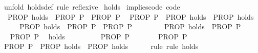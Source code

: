 \begin{isabellebody}
%
\isatagproof
{}\isamarkupfalse%
\ {\isacharparenleft}{\kern0pt}unfold\ holds{\isacharunderscore}{\kern0pt}def{\isacharparenright}{\kern0pt}\ {\isacharparenleft}{\kern0pt}rule\ reflexive{\isacharparenright}{\kern0pt}%
\endisatagproof
{\isafoldproof}%
%
\isadelimproof
\isanewline
%
\endisadelimproof
\isanewline
{}\isamarkupfalse%
\ holds\isanewline
\isanewline
{}\isamarkupfalse%
\ implies{\isacharunderscore}{\kern0pt}code\ {\isacharbrackleft}{\kern0pt}code{\isacharbrackright}{\kern0pt}{\isacharcolon}{\kern0pt}\isanewline
\ \ {\isachardoublequoteopen}{\isacharparenleft}{\kern0pt}PROP\ holds\ {\isasymLongrightarrow}\ PROP\ P{\isacharparenright}{\kern0pt}\ {\isasymequiv}\ PROP\ P{\isachardoublequoteclose}\isanewline
\ \ {\isachardoublequoteopen}{\isacharparenleft}{\kern0pt}PROP\ P\ {\isasymLongrightarrow}\ PROP\ holds{\isacharparenright}{\kern0pt}\ {\isasymequiv}\ PROP\ holds{\isachardoublequoteclose}\isanewline
%
\isadelimproof
%
\endisadelimproof
%
\isatagproof
{}\isamarkupfalse%
\ {\isacharminus}{\kern0pt}\isanewline
\ \ \isamarkupfalse%
\ {\isachardoublequoteopen}{\isacharparenleft}{\kern0pt}PROP\ holds\ {\isasymLongrightarrow}\ PROP\ P{\isacharparenright}{\kern0pt}\ {\isasymequiv}\ PROP\ P{\isachardoublequoteclose}\isanewline
\ \ \isamarkupfalse%
\isanewline
\ \ \ \ \isamarkupfalse%
\ {\isachardoublequoteopen}PROP\ holds\ {\isasymLongrightarrow}\ PROP\ P{\isachardoublequoteclose}\isanewline
\ \ \ \ \isamarkupfalse%
\ \isamarkupfalse%
\ {\isachardoublequoteopen}PROP\ P{\isachardoublequoteclose}\ \isamarkupfalse%
\ holds\ \isacommand{{\isachardot}{\kern0pt}}\isamarkupfalse%
\isanewline
\ \ \isamarkupfalse%
\isanewline
\ \ \ \ \isamarkupfalse%
\ {\isachardoublequoteopen}PROP\ P{\isachardoublequoteclose}\isanewline
\ \ \ \ \isamarkupfalse%
\ \isamarkupfalse%
\ {\isachardoublequoteopen}PROP\ P{\isachardoublequoteclose}\ \isacommand{{\isachardot}{\kern0pt}}\isamarkupfalse%
\isanewline
\ \ \isamarkupfalse%
\isanewline
{}\isamarkupfalse%
\isanewline
\ \ \isamarkupfalse%
\ {\isachardoublequoteopen}{\isacharparenleft}{\kern0pt}PROP\ P\ {\isasymLongrightarrow}\ PROP\ holds{\isacharparenright}{\kern0pt}\ {\isasymequiv}\ PROP\ holds{\isachardoublequoteclose}\isanewline
\ \ \ \ \isamarkupfalse%
\ rule\ {\isacharparenleft}{\kern0pt}rule\ holds{\isacharparenright}{\kern0pt}{\isacharplus}{\kern0pt}\isanewline

\end{isabellebody}
